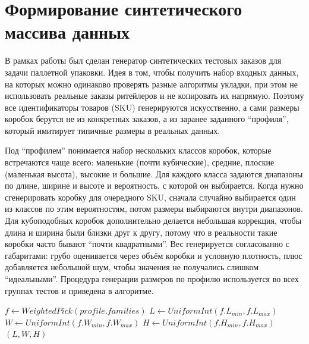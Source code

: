 \section{Формирование синтетического массива данных}


В рамках работы был сделан генератор синтетических тестовых заказов для задачи паллетной упаковки. Идея в том, чтобы получить набор входных данных, на которых можно одинаково проверять разные алгоритмы укладки, при этом не использовать реальные заказы ритейлеров и не копировать их напрямую. Поэтому все идентификаторы товаров (SKU) генерируются искусственно, а сами размеры коробок берутся не из конкретных заказов, а из заранее заданного “профиля”, который имитирует типичные размеры в реальных данных.  

Под “профилем” понимается набор нескольких классов коробок, которые встречаются чаще всего: маленькие (почти кубические), средние, плоские (маленькая высота), высокие и большие. Для каждого класса задаются диапазоны по длине, ширине и высоте и вероятность, с которой он выбирается. Когда нужно сгенерировать коробку для очередного SKU, сначала случайно выбирается один из классов по этим вероятностям, потом размеры выбираются внутри диапазонов. Для кубоподобных коробок дополнительно делается небольшая коррекция, чтобы длина и ширина были близки друг к другу, потому что в реальности такие коробки часто бывают “почти квадратными”. Вес генерируется согласованно с габаритами: грубо оценивается через объём коробки и условную плотность, плюс добавляется небольшой шум, чтобы значения не получались слишком “идеальными”. Процедура генерации размеров по профилю используется во всех группах тестов и приведена в алгоритме.

\begin{algorithm}[H]
\caption{Sample box dimensions from the profile (mixture of families)}
$f \leftarrow WeightedPick(profile.families)$\;
$L \leftarrow UniformInt(f.L_{min}, f.L_{max})$\;
$W \leftarrow UniformInt(f.W_{min}, f.W_{max})$\;
$H \leftarrow UniformInt(f.H_{min}, f.H_{max})$\;
\Return $(L,W,H)$\;
\end{algorithm}

